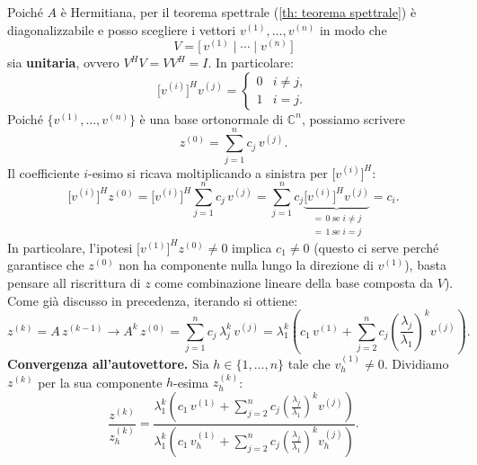 \documentclass[12pt,a4paper,]{report}
\begin{document}
\begin{dimostrazione}
    Poiché $A$ è Hermitiana, per il teorema spettrale (\autoref{th: teorema spettrale}) è diagonalizzabile e posso scegliere i vettori $v^{(1)}, \ldots, v^{(n)}$ in modo che
    \[
        V = \bigl[\,v^{(1)} \mid \cdots \mid v^{(n)}\,\bigr]
    \]
    sia \textbf{unitaria}, ovvero $V^H V = V V^H = I$. In particolare:
    \[
        \bigl[v^{(i)}\bigr]^{\!H} v^{(j)} =
        \begin{cases}
            0 & i \neq j, \\
            1 & i = j.
        \end{cases}
    \]
    Poiché $\{v^{(1)}, \ldots, v^{(n)}\}$ è una base ortonormale di $\mathbb{C}^n$,
    possiamo scrivere
    \[
        z^{(0)} = \sum_{j=1}^{n} c_j\, v^{(j)}.
    \]
    Il coefficiente $i$-esimo si ricava moltiplicando a sinistra per
    $\bigl[v^{(i)}\bigr]^{\!H}$:
    \[
        \bigl[v^{(i)}\bigr]^{\!H} z^{(0)}
        = \bigl[v^{(i)}\bigr]^{\!H} \sum_{j=1}^{n} c_j\, v^{(j)}
        = \sum_{j=1}^{n} c_j
        \underbrace{\bigl[v^{(i)}\bigr]^{\!H} v^{(j)}}_{\substack{=\,0 \; \text{se } i\neq j\\=\,1 \; \text{se } i=j}}
        = c_i.
    \]
    In particolare, l'ipotesi $\bigl[v^{(1)}\bigr]^{\!H} z^{(0)} \neq 0$ implica $c_1 \neq 0$ (questo ci serve perché garantisce che $z^{(0)}$ non ha componente nulla lungo la direzione di $v^{(1)}$), basta pensare all riscrittura di $z$ come combinazione lineare della base composta da $V$).
    \\
    Come già discusso in precedenza, iterando si ottiene:
    \[
        z^{(k)} = A\,z^{(k-1)} \to A^k\,z^{(0)}
        = \sum_{j=1}^{n} c_j\,\lambda_j^k\,v^{(j)}
        = \lambda_1^k \left(
            c_1\,v^{(1)}
            + \sum_{j=2}^{n} c_j \left(\frac{\lambda_j}{\lambda_1}\right)^{\!k} v^{(j)}
        \right).
    \]
    \medskip
    \textbf{Convergenza all'autovettore.}
    Sia $h \in \{1,\ldots,n\}$ tale che $v_h^{(1)} \neq 0$.
    Dividiamo $z^{(k)}$ per la sua componente $h$-esima $z_h^{(k)}$:
    \[
        \frac{z^{(k)}}{z_h^{(k)}}
        =
        \frac{
            \lambda_1^k\!\left(
                c_1\,v^{(1)}
                + \displaystyle\sum_{j=2}^{n} c_j
                \!\left(\tfrac{\lambda_j}{\lambda_1}\right)^{\!k}\! v^{(j)}
            \right)
        }{
            \lambda_1^k\!\left(
                c_1\,v_h^{(1)}
                + \displaystyle\sum_{j=2}^{n} c_j
                \!\left(\tfrac{\lambda_j}{\lambda_1}\right)^{\!k}\! v_h^{(j)}
            \right)
        }.
\]
\end{dimostrazione}
\end{document}
